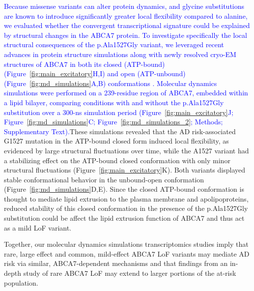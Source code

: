 \newcommand{\quoteP}{\textcolor{blue}{Because missense variants can alter protein dynamics, and glycine substitutions are known to introduce significantly greater local flexibility compared to alanine, we evaluated whether the convergent transcriptional signature could be explained by structural changes in the ABCA7 protein. To investigate specifically the local structural consequences of the p.Ala1527Gly variant, we leveraged recent advances in protein structure simulations along with newly resolved cryo-EM structures of ABCA7 in both its closed (ATP-bound) (Figure~\ref{fig:main_excitatory}H,I) and open (ATP-unbound) (Figure~\ref{fig:md_simulations}A,B) conformations \cite{Le_Thi_My2022-dp,Jumper2021-na}. Molecular dynamics simulations were performed on a 239-residue region of ABCA7, embedded within a lipid bilayer, comparing conditions with and without the p.Ala1527Gly substitution over a 300-ns simulation period (Figure~\ref{fig:main_excitatory}J; Figure~\ref{fig:md_simulations}C; Figure~\ref{fig:md_simulations_2}; Methods; Supplementary Text).\label{quoteL-labeP}}} 
\quoteP These simulations revealed that the AD risk-associated G1527 mutation in the ATP-bound closed form induced local flexibility, as evidenced by large structural fluctuations over time, while the A1527 variant had a stabilizing effect on the ATP-bound closed conformation with only minor structural fluctuations (Figure~\ref{fig:main_excitatory}K). Both variants displayed stable conformational behavior in the unbound-open conformation (Figure~\ref{fig:md_simulations}D,E). Since the closed ATP-bound conformation is thought to mediate lipid extrusion to the plasma membrane and apolipoproteins\cite{Le_Thi_My2022-dp,Fang2025}, reduced stability of this closed conformation in the presence of the p.Ala1527Gly substitution could be affect the lipid extrusion function of ABCA7 and thus act as a mild LoF variant.

Together, our molecular dynamics simulations transcriptomics studies imply that rare, large effect and common, mild-effect ABCA7 LoF variants may mediate AD risk via similar, ABCA7-dependent mechanisms and that findings from an in-depth study of rare ABCA7 LoF may extend to larger portions of the at-risk population.

